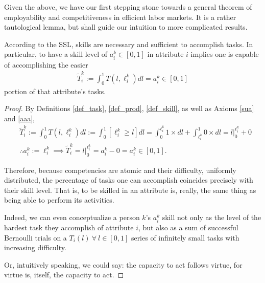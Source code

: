 \documentclass[hidelinks, nonatbib]{elsarticle}
\begin{document}
Given the above, we have our first stepping stone towards a general theorem of employability and competitiveness in efficient labor markets. It is a rather tautological lemma, but shall guide our intuition to more complicated results.
\begin{lemma}
    \label{ssl}
    According to the SSL, skills are necessary and sufficient to accomplish tasks.
    In particular, to have a skill level of $a_{i}^{k} \in [0,1]$ in attribute $i$ implies one is capable of accomplishing the easier
    \begin{gather}
        \tilde{T}_{i}^{k}
        :=
        \int_{0}^{1}
        T(l, \ell_{i}^{k})
        dl
        =
        a_{i}^{k}
        \in
        [0,1]
    \end{gather}
    portion of that attribute's tasks.
\end{lemma}

\begin{proof}
    By Definitions \ref{def_task}, \ref{def_prod}, \ref{def_skill}, as well as Axioms \ref{sua} and \ref{aaa},
    \begin{align}
        &
        \tilde{T}_{i}^{k}
        :=
        \int_{0}^{1}
        T(l, \ell_{i}^{k})
        dl
        :=
        \int_{0}^{1}
        [
            \ell_{i}^{k}
            \geq
            l
        ]
        dl
        =
        \int_{0}^{\ell_{i}^{k}}
        1
        \times
        dl
        +
        \int_{\ell_{i}^{k}}^{1}
        0
        \times
        dl
        =
        l\big|_{0}^{\ell_{i}^{k}}
        + 0
        \\
        &
        \therefore
        a_{i}^{k}
        :=
        \ell_{i}^{k}
        \implies
        \tilde{T}_{i}^{k}
        =
        l\big|_{0}^{\ell_{i}^{k}}
        =
        a_{i}^{k}
        - 0
        =
        a_{i}^{k}
        \in
        [0,1]
        .
    \end{align}

    Therefore, because competencies are atomic and their difficulty, uniformly distributed, the percentage of tasks one can accomplish coincides precisely with their skill level. That is, to be skilled in an attribute is, really, the same thing as being able to perform its activities.
    
    Indeed, we can even conceptualize a person $k$'s $a_{i}^{k}$ skill not only as the level of the hardest task they accomplish of attribute $i$, but also as a sum of successful Bernoulli trials on a $T_i(l) \ \forall \ l \in [0,1]$ series of infinitely small tasks with increasing difficulty.
    
    Or, intuitively speaking, we could say: the capacity to act follows virtue, for virtue is, itself, the capacity to act.
\end{proof}
\end{document}
